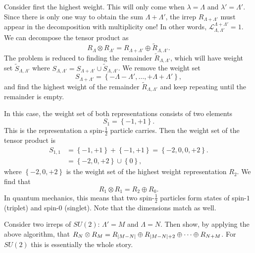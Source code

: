 Consider first the highest weight. This will only come when $\lambda = \Lambda$ and $\lambda' = \Lambda'$. Since there is only one way to obtain the sum $\Lambda + \Lambda'$, the irrep $R_{\Lambda + \Lambda'}$ must appear in the decomposition with multiplicity one!
In other words, $\mathcal{L}^{\Lambda + \Lambda'}_{\Lambda, \Lambda'} = 1$.
We can decompose the tensor product as
\begin{equation}
  R_{\Lambda} \otimes R_{\Lambda'} = R_{\Lambda + \Lambda'} \oplus \widetilde{R}_{\Lambda, \Lambda'}.
\end{equation}
The problem is reduced to finding the remainder $\widetilde{R}_{\Lambda, \Lambda'}$, which will have weight set $\widetilde{S}_{\Lambda, \Lambda'}$ where $S_{\Lambda, \Lambda'} = S_{\Lambda + \Lambda'} \cup \widetilde{S}_{\Lambda, \Lambda'}$. 
We remove the weight set
\begin{equation}
  S_{\Lambda + \Lambda'} = \left\{ -\Lambda - \Lambda', \dots, + \Lambda + \Lambda' \right\}, 
\end{equation}
and find the highest weight of the remainder $\widetilde{R}_{\Lambda, \Lambda'}$ and keep repeating until the remainder is empty.

\begin{example}[$\Lambda = \Lambda' = 1$]
  In this case, the weight set of both representations consists of two elements
  \begin{equation}
    S_1 = \left\{ -1 , +1 \right\}.
  \end{equation}
  This is the representation a spin-$\frac{1}{2}$ particle carries.
  Then the weight set of the tensor product is 
  \begin{align}
    S_{1, 1} &= \left\{ -1, +1 \right\} + \left\{ -1, +1 \right\} = \left\{ -2, 0, 0, +2 \right\}. \\
	     &= \left\{ -2, 0, +2 \right\} \cup \left\{ 0 \right\},
  \end{align}
  where $\left\{ -2, 0, +2 \right\}$ is the weight set of the highest weight representation $R_2$. We find that
  \begin{equation}
    R_1 \otimes R_1 = R_2 \oplus R_0.
  \end{equation}
  In quantum mechanics, this means that two spin-$\frac{1}{2}$ particles form states of spin-$1$ (triplet) and spin-$0$ (singlet).
  Note that the dimensions match as well.
\end{example}
\begin{exercise}[Sheet 2, Qu 8]
  Consider two irreps of $SU(2)$: $\Lambda' = M$ and $\Lambda = N$. Then show, by applying the above algorithm, that $R_N \otimes R_M = R_{\abs{M-N}} \oplus R_{\abs{M-N} + 2} \oplus \dots \oplus R_{N + M}$.
  For $SU(2)$ this is essentially the whole story.
\end{exercise}

